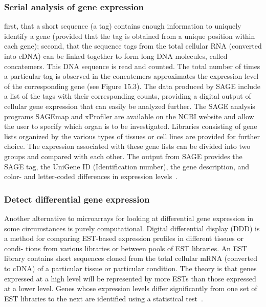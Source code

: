 \documentclass{report}
\begin{document}
\subsubsection{Serial analysis of gene expression}

first, that a short sequence (a tag) contains enough information to uniquely identify a gene (provided that the tag is obtained from a unique position within each gene); second, that the sequence tags from the total cellular RNA (converted into cDNA) can be linked together to form long DNA molecules, called concatemers. This DNA sequence is read and counted. The total number of times a particular tag is observed in the concatemers approximates the expression level of the corresponding gene (see Figure 15.3). The data produced by SAGE include a list of the tags with their corresponding counts, providing a digital output of cellular gene expression that can easily be analyzed further. The SAGE analysis programs SAGEmap and xProfiler are available on the NCBI website and allow the user to specify which organ is to be investigated. Libraries consisting of gene lists organized by the various types of tissues or cell lines are provided for further choice. The expression associated with these gene lists can be divided into two groups and compared with each other. The output from SAGE provides the SAGE tag, the UniGene ID (Identification number), the gene description, and color- and letter-coded differences in expression levels~\cite{zvelebil_understanding_2008}.

\subsubsection{Detect differential gene expression}

Another alternative to microarrays for looking at differential gene expression in some circumstances is purely computational. Digital differential display (DDD) is a method for comparing EST-based expression profiles in different tissues or condi- tions from various libraries or between pools of EST libraries. An EST library contains short sequences cloned from the total cellular mRNA (converted to cDNA) of a particular tissue or particular condition. The theory is that genes expressed at a high level will be represented by more ESTs than those expressed at a lower level. Genes whose expression levels differ significantly from one set of EST libraries to the next are identified using a statistical test~\cite{zvelebil_understanding_2008}.
\end{document}
